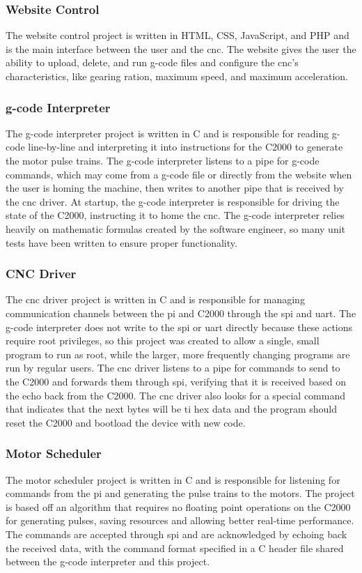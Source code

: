 \subsubsection{Website Control}
The website control project is written in HTML, CSS, JavaScript, and PHP and is the main interface between the user and the \gls{cnc}.
The website gives the user the ability to upload, delete, and run g-code files and configure the \gls{cnc}'s characteristics, like gearing ration, maximum speed, and maximum acceleration.

\subsubsection{g-code Interpreter}
The g-code interpreter project is written in C and is responsible for reading g-code line-by-line and interpreting it into instructions for the C2000 to generate the motor pulse trains.
The g-code interpreter listens to a pipe for g-code commands, which may come from a g-code file or directly from the website when the user is homing the machine, then writes to another pipe that is received by the \gls{cnc} driver.
At startup, the g-code interpreter is responsible for driving the state of the C2000, instructing it to home the \gls{cnc}.
The g-code interpreter relies heavily on mathematic formulas created by the software engineer, so many unit tests have been written to ensure proper functionality.

\subsubsection{CNC Driver}
The \gls{cnc} driver project is written in C and is responsible for managing communication channels between the \gls{pi} and C2000 through the \gls{spi} and \gls{uart}.
The g-code interpreter does not write to the \gls{spi} or \gls{uart} directly because these actions require root privileges, so this project was created to allow a single, small program to run as root, while the larger, more frequently changing programs are run by regular users.
The \gls{cnc} driver listens to a pipe for commands to send to the C2000 and forwards them through \gls{spi}, verifying that it is received based on the echo back from the C2000.
The \gls{cnc} driver also looks for a special command that indicates that the next bytes will be \gls{ti} hex data and the program should reset the C2000 and bootload the device with new code.

\subsubsection{Motor Scheduler}
The motor scheduler project is written in C and is responsible for listening for commands from the \gls{pi} and generating the pulse trains to the motors.
The project is based off an algorithm that requires no floating point operations on the C2000 for generating pulses, saving resources and allowing better real-time performance.
The commands are accepted through \gls{spi} and are acknowledged by echoing back the received data, with the command format specified in a C header file shared between the g-code interpreter and this project.

